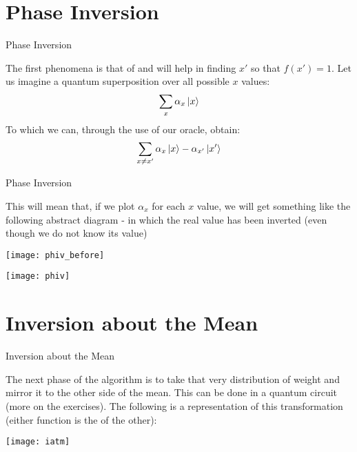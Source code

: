 \documentclass[aspectratio=43]{beamer}
\begin{document}
\section{Phase Inversion}
\begin{frame}{Phase Inversion}
    \begin{card}
        The first phenomena is that of \phiv and will help in finding $x'$ so that $f(x')=1$. Let us imagine a quantum superposition over all possible $x$ values:
        \begin{equation*}
            \sum_x\alpha_x \ket{x}
        \end{equation*}
        To which we can, through the use of our oracle, obtain:
        \begin{equation*}
            \sum_{x\neq x'}\alpha_x \ket{x} - \alpha_{x'}\ket{x'}
        \end{equation*}
    \end{card}
\pagenumber
\end{frame}
\begin{frame}{Phase Inversion}
    \begin{cardTiny}
        This will mean that, if we plot $\alpha_x$ for each $x$ value, we will get something like the following abstract diagram - in which the real value has been inverted (even though we do not know its value)
        \begin{multicols}{2}
            \begin{center}
                \texttt{[image: phiv\_before]}
            \end{center}
            \begin{center}
                \texttt{[image: phiv]}
            \end{center}
        \end{multicols}
    \end{cardTiny}
\pagenumber
\end{frame}


\section{Inversion about the Mean}
\begin{frame}{Inversion about the Mean}
    \begin{cardTiny}
    The next phase of the algorithm is to take that very distribution of weight and mirror it to the other side of the mean. This can be done in a quantum circuit (more on the exercises). The following is a representation of this transformation (either function is the \iatm of the other):
    \begin{center}
        \texttt{[image: iatm]}
    \end{center}
    \end{cardTiny}
\pagenumber
\end{frame}
\end{document}
